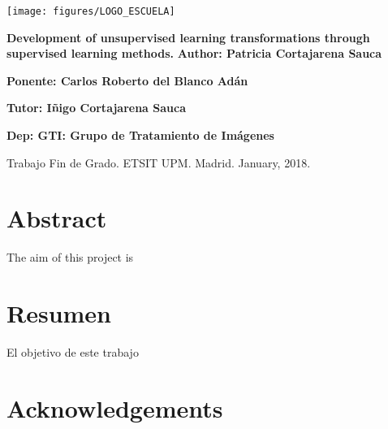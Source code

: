\documentclass[a4paper,11pt,spanish]{report}
\begin{document}
\raggedbottom


\thispagestyle{empty}
\begin{flushright}
\texttt{[image: figures/LOGO\_ESCUELA]}
\end{flushright}
\vskip40mm
\begin{center}
\huge\textbf{Development of unsupervised learning transformations through supervised learning methods.}
\vskip2mm
\LARGE\textit{}
\vskip5mm
\Large\textbf{Author: Patricia Cortajarena Sauca}

\Large\textbf{Ponente: Carlos Roberto del Blanco Adán}

\Large\textbf{Tutor: Iñigo Cortajarena Sauca}

\Large\textbf{Dep: GTI: Grupo de Tratamiento de Imágenes}

\end{center}
\vfill
\begin{flushleft}
\large
Trabajo Fin de Grado.
ETSIT UPM.
Madrid. January, 2018.
\end{flushleft}

\chapter*{Abstract}
\setcounter{page}{3}

The aim of this project is  

\chapter*{Resumen}
\setcounter{page}{4}

El objetivo de este trabajo

\chapter*{Acknowledgements}
\end{document}

